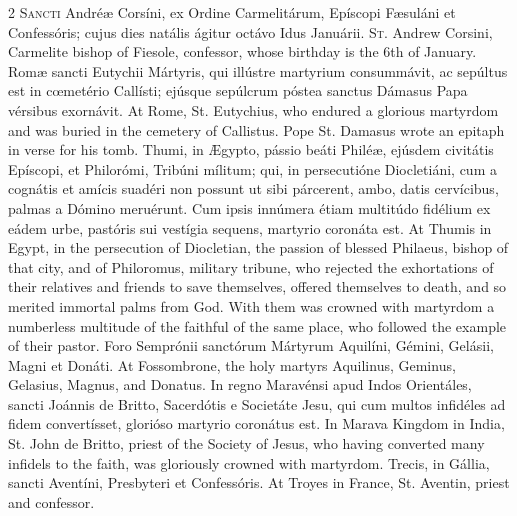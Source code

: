 \begin{paracol}{2}
\lettrine[lines=2]{S}{ancti} Andréæ Corsíni, ex Ordine Carmelitárum, 
 Epíscopi Fæsuláni et Confessóris; cujus dies natális ágitur octávo Idus 
 Januárii.
\switchcolumn
{}
\lettrine[lines=2]{S}{t.} Andrew Corsini, Carmelite bishop of Fiesole, confessor, whose birthday 
 is the 6th of January.
\switchcolumn*
{}
Romæ sancti Eutychii Mártyris, qui illústre 
 martyrium consummávit, ac sepúltus est in cœmetério Callísti; ejúsque 
 sepúlcrum póstea sanctus Dámasus Papa vérsibus exornávit.
\switchcolumn
{}
At Rome, St. Eutychius, who endured a glorious martyrdom and was buried in 
 the cemetery of Callistus. Pope St. Damasus wrote an epitaph in verse 
 for his tomb.
\switchcolumn*
{}
Thumi, in Ægypto, pássio beáti Philéæ, ejúsdem 
 civitátis Epíscopi, et Philorómi, Tribúni mílitum; qui, in persecutióne 
 Diocletiáni, cum a cognátis et amícis suadéri non possunt ut sibi párcerent, 
 ambo, datis cervícibus, palmas a Dómino meruérunt. Cum ipsis innúmera 
 étiam multitúdo fidélium ex eádem urbe, pastóris sui vestígia sequens, 
 martyrio coronáta est.
\switchcolumn
{}
At Thumis in Egypt, in the persecution of Diocletian, the passion of blessed 
 Philaeus, bishop of that city, and of Philoromus, military tribune, who 
 rejected the exhortations of their relatives and friends to save themselves, 
 offered themselves to death, and so merited immortal palms from God. 
 With them was crowned with martyrdom a numberless multitude of the faithful 
 of the same place, who followed the example of their pastor.
\switchcolumn*
{}
Foro Semprónii sanctórum Mártyrum Aquilíni, Gémini, Gelásii, Magni et Donáti.
\switchcolumn
{}
At Fossombrone, the holy martyrs Aquilinus, Geminus, Gelasius, Magnus, and 
 Donatus.
\switchcolumn*
{}
In regno Maravénsi apud Indos Orientáles, sancti Joánnis de Britto, 
 Sacerdótis e Societáte Jesu, qui cum multos infidéles ad fidem convertísset, 
 glorióso martyrio coronátus est.
\switchcolumn
{}
In Marava Kingdom in India, St. John de Britto, priest of the Society of 
 Jesus, who having converted many infidels to the faith, was gloriously 
 crowned with martyrdom.
\switchcolumn*
{}
Trecis, in Gállia, sancti Aventíni, Presbyteri et Confessóris.
\switchcolumn
{}
At Troyes in France, St. Aventin, priest and confessor.
\switchcolumn*
{}

\end{paracol}
